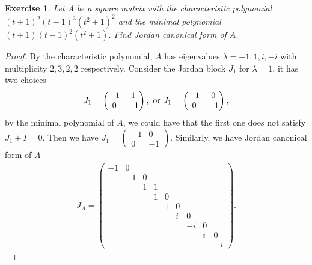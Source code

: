 \documentclass[11pt]{article}
\newtheorem{exercise}{Exercise}[section]
\theoremstyle{definition}
\numberwithin{equation}{subsection}
\begin{document}
\begin{exercise}
Let $A$ be a square matrix with the characteristic polynomial $(t + 1)^2 (t - 1)^3 (t^2 + 1)^2$ and the minimal polynomial $(t + 1) (t - 1)^2 (t^2 + 1)$. Find Jordan canonical form of $A$.
\end{exercise}
\begin{proof}
By the characteristic polynomial, $A$ has eigenvalues $\lambda = -1, 1, i, -i$ with multiplicity $2, 3, 2, 2$ respectively. Consider the Jordan block $J_1$ for $\lambda = 1$, it has two choices
\begin{align*}
    J_1 = \begin{pmatrix} 
        -1 & 1\\
        0 & -1
    \end{pmatrix}, \,\, {\rm or}\,\, J_1 =  \begin{pmatrix} 
        -1 & 0\\
        0 & -1
    \end{pmatrix},
\end{align*}
by the minimal polynomial of $A$, we could have that the first one does not satisfy $J_1 + I = 0$. Then we have $J_1 = \begin{pmatrix} -1 & 0 \\ 0 & -1 \end{pmatrix}$. Similarly, we have Jordan canonical form of $A$
\begin{align*}
    J_A = \begin{pmatrix} 
    -1 & 0 & & & & & & & \\
    & -1 & 0 & & & & & & \\
    & & 1 & 1 & & & & & \\
    & & & 1 & 0 & & & & \\
    & & & & 1 & 0 & & & \\
    & & & & & i & 0 & & \\
    & & & & & & -i & 0 & \\
    & & & & & & & i & 0 \\
    & & & & & & & & -i
    \end{pmatrix}.
\end{align*}
\end{proof}

\medskip
\end{document}
